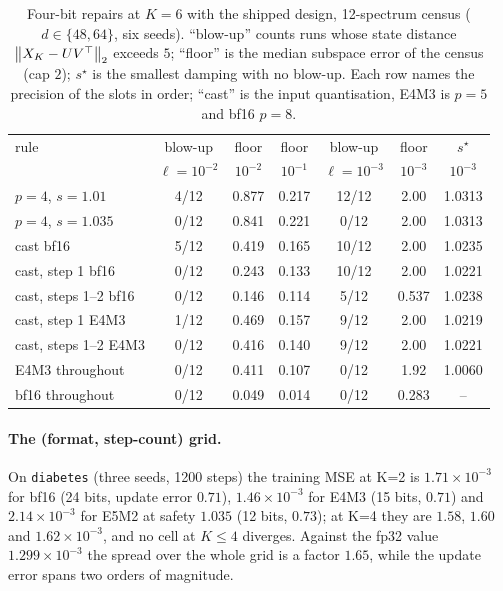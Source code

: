\begin{table}[h]
\centering
\caption{Four-bit repairs at $K=6$ with the shipped design, 12-spectrum census
($d\in\{48,64\}$, six seeds).  ``blow-up'' counts runs whose state distance
$\left\lVert X_K-UV^\top \right\rVert_2$ exceeds $5$; ``floor'' is the median subspace error of the census
(cap $2$); $s^\star$ is the smallest damping with no blow-up.  Each row names the
precision of the slots in order; ``cast'' is the input quantisation, E4M3 is $p=5$ and
bf16 $p=8$.}
\label{tab:e5m2}
\begin{tabular}{lcccccc}
\toprule
rule & blow-up & floor & floor & blow-up & floor & $s^\star$ \\
     & $\ell=10^{-2}$ & $10^{-2}$ & $10^{-1}$ & $\ell=10^{-3}$ & $10^{-3}$ & $10^{-3}$ \\
\midrule
$p=4$, $s=1.01$ & 4/12 & 0.877 & 0.217 & 12/12 & 2.00 & 1.0313 \\
$p=4$, $s=1.035$ & 0/12 & 0.841 & 0.221 & 0/12 & 2.00 & 1.0313 \\
cast bf16 & 5/12 & 0.419 & 0.165 & 10/12 & 2.00 & 1.0235 \\
cast, step 1 bf16 & 0/12 & 0.243 & 0.133 & 10/12 & 2.00 & 1.0221 \\
cast, steps 1--2 bf16 & 0/12 & 0.146 & 0.114 & 5/12 & 0.537 & 1.0238 \\
cast, step 1 E4M3 & 1/12 & 0.469 & 0.157 & 9/12 & 2.00 & 1.0219 \\
cast, steps 1--2 E4M3 & 0/12 & 0.416 & 0.140 & 9/12 & 2.00 & 1.0221 \\
E4M3 throughout & 0/12 & 0.411 & 0.107 & 0/12 & 1.92 & 1.0060 \\
bf16 throughout & 0/12 & 0.049 & 0.014 & 0/12 & 0.283 & -- \\
\bottomrule
\end{tabular}
\end{table}

\paragraph{The (format, step-count) grid.}  On \texttt{diabetes} (three seeds, 1200
steps) the training MSE at K=2 is $1.71\times10^{-3}$ for bf16 (24 bits, update error
$0.71$), $1.46\times10^{-3}$ for E4M3 (15 bits, $0.71$) and $2.14\times10^{-3}$ for E5M2
at safety $1.035$ (12 bits, $0.73$); at K=4 they are $1.58$, $1.60$ and
$1.62\times10^{-3}$, and no cell at $K\le4$ diverges.  Against the fp32 value $1.299\times10^{-3}$ the spread over the whole grid is
a factor $1.65$, while the update error spans two orders of magnitude.

